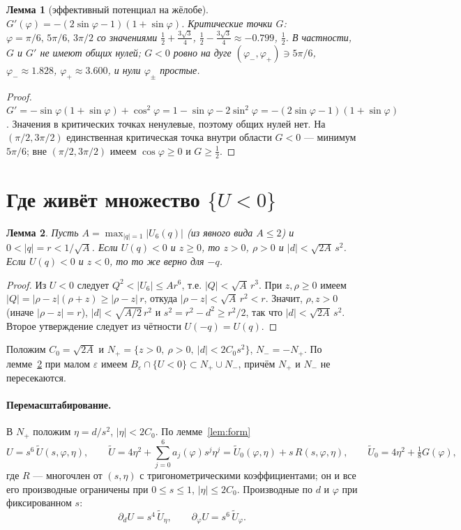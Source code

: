 \documentclass[11pt,a4paper]{article}
\newtheorem{lemma}{Лемма}
\theoremstyle{definition}
\newcommand{\eps}{\varepsilon}
\newcommand{\tU}{\widetilde U}
\begin{document}
\begin{lemma}[эффективный потенциал на жёлобе]\label{lem:G}
$G'(\varphi)=-(2\sin\varphi-1)(1+\sin\varphi)$. Критические точки $G$: $\varphi=\pi/6,\,5\pi/6,\,3\pi/2$ со
значениями $\frac12+\frac{3\sqrt3}{4}$, $\frac12-\frac{3\sqrt3}{4}\approx-0.799$, $\frac12$. В частности,
\emph{$G$ и $G'$ не имеют общих нулей}; $G<0$ ровно на дуге $(\varphi_-,\varphi_+)\ni5\pi/6$,
$\varphi_-\approx1.828$, $\varphi_+\approx3.600$, и нули $\varphi_\pm$ простые.
\end{lemma}
\begin{proof}
$G'=-\sin\varphi(1+\sin\varphi)+\cos^2\varphi=1-\sin\varphi-2\sin^2\varphi=-(2\sin\varphi-1)(1+\sin\varphi)$.
Значения в критических точках ненулевые, поэтому общих нулей нет. На $(\pi/2,3\pi/2)$ единственная
критическая точка внутри области $G<0$ --- минимум $5\pi/6$; вне $(\pi/2,3\pi/2)$ имеем $\cos\varphi\ge0$ и
$G\ge\frac12$.
\end{proof}

\section{Где живёт множество $\{U<0\}$}
\begin{lemma}\label{lem:loc}
Пусть $A=\max_{|q|=1}|U_6(q)|$ (из явного вида $A\le2$) и $0<|q|=r<1/\sqrt A$. Если $U(q)<0$ и $z\ge0$, то
$z>0$, $\rho>0$ и $|d|<\sqrt{2A}\,s^2$. Если $U(q)<0$ и $z<0$, то то же верно для $-q$.
\end{lemma}
\begin{proof}
Из $U<0$ следует $Q^2<|U_6|\le Ar^6$, т.е. $|Q|<\sqrt A\,r^3$. При $z,\rho\ge0$ имеем
$|Q|=|\rho-z|(\rho+z)\ge|\rho-z|\,r$, откуда $|\rho-z|<\sqrt A\,r^2<r$. Значит, $\rho,z>0$ (иначе $|\rho-z|=r$),
$|d|<\sqrt{A/2}\,r^2$ и $s^2=r^2-d^2\ge r^2/2$, так что $|d|<\sqrt{2A}\,s^2$. Второе утверждение следует из
чётности $U(-q)=U(q)$.
\end{proof}

Положим $C_0=\sqrt{2A}$ и $N_+=\{z>0,\ \rho>0,\ |d|<2C_0s^2\}$, $N_-=-N_+$. По лемме~\ref{lem:loc}
при малом $\eps$ имеем $B_\eps\cap\{U<0\}\subset N_+\cup N_-$, причём $N_+$ и $N_-$ не пересекаются.

\paragraph{Перемасштабирование.} В $N_+$ положим $\eta=d/s^2$, $|\eta|<2C_0$. По лемме~\ref{lem:form}
\begin{equation}\label{eq:scaled}
U=s^6\,\tU(s,\varphi,\eta),\qquad \tU=4\eta^2+\sum_{j=0}^6a_j(\varphi)s^j\eta^j=\tU_0(\varphi,\eta)+s\,R(s,\varphi,\eta),
\qquad \tU_0=4\eta^2+\tfrac18G(\varphi),
\end{equation}
где $R$ --- многочлен от $(s,\eta)$ с тригонометрическими коэффициентами; он и все его производные
ограничены при $0\le s\le1$, $|\eta|\le2C_0$. Производные по $d$ и $\varphi$ при фиксированном $s$:
\begin{equation}\label{eq:derivs}
\partial_dU=s^4\,\tU_\eta,\qquad \partial_\varphi U=s^6\,\tU_\varphi .
\end{equation}
\end{document}
